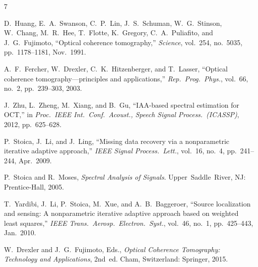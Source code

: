 \documentclass[conference]{IEEEtran}
\begin{document}
\begin{thebibliography}{7}

D.~Huang, E.~A.~Swanson, C.~P.~Lin, J.~S.~Schuman, W.~G.~Stinson,
W.~Chang, M.~R.~Hee, T.~Flotte, K.~Gregory, C.~A.~Puliafito, and
J.~G.~Fujimoto, ``Optical coherence tomography,'' \emph{Science},
vol.~254, no.~5035, pp.~1178--1181, Nov.~1991.

A.~F.~Fercher, W.~Drexler, C.~K.~Hitzenberger, and T.~Lasser,
``Optical coherence tomography---principles and applications,''
\emph{Rep.~Prog.~Phys.}, vol.~66, no.~2, pp.~239--303, 2003.

J.~Zhu, L.~Zheng, M.~Xiang, and B.~Gu, ``IAA-based spectral estimation
for OCT,'' in \emph{Proc.~IEEE Int.~Conf.~Acoust., Speech Signal
Process.~(ICASSP)}, 2012, pp.~625--628.

P.~Stoica, J.~Li, and J.~Ling, ``Missing data recovery via a
nonparametric iterative adaptive approach,'' \emph{IEEE Signal
Process.~Lett.}, vol.~16, no.~4, pp.~241--244, Apr.~2009.

P.~Stoica and R.~Moses, \emph{Spectral Analysis of Signals}.
Upper~Saddle~River, NJ: Prentice-Hall, 2005.

T.~Yardibi, J.~Li, P.~Stoica, M.~Xue, and A.~B.~Baggeroer, ``Source
localization and sensing: A nonparametric iterative adaptive approach
based on weighted least squares,'' \emph{IEEE Trans.~Aerosp.~Electron.~Syst.},
vol.~46, no.~1, pp.~425--443, Jan.~2010.

W.~Drexler and J.~G.~Fujimoto, Eds., \emph{Optical Coherence
Tomography: Technology and Applications}, 2nd~ed.
Cham, Switzerland: Springer, 2015.

\end{thebibliography}
\end{document}
